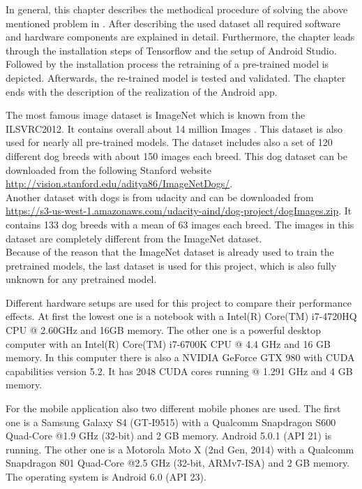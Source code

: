 In general, this chapter describes the methodical procedure of solving the above mentioned problem in . After describing the used dataset all required software and hardware components are explained in detail. Furthermore, the chapter leads through the installation steps of Tensorflow and the setup of Android Studio. Followed by the installation process the retraining of a pre-trained model is depicted. Afterwards, the re-trained model is tested and validated. The chapter ends with the description of the realization of the Android app.

The most famous image dataset is ImageNet which is known from the ILSVRC2012. It contains overall about 14 million Images \citep{ImageNet2010}. This dataset is also used for nearly all pre-trained models. The dataset includes also a set of 120 different dog breeds with about 150 images each breed. This dog dataset can be downloaded from the following Stanford website \url{http://vision.stanford.edu/aditya86/ImageNetDogs/}. \\
Another dataset with dogs is from udacity and can be downloaded from \url{https://s3-us-west-1.amazonaws.com/udacity-aind/dog-project/dogImages.zip}. It contains 133 dog breeds with a mean of 63 images each breed. The images in this dataset are completely different from the ImageNet dataset. \\

Because of the reason that the ImageNet dataset is already used to train the pretrained models, the last dataset is used for this project, which is also fully unknown for any pretrained model.

Different hardware setups are used for this project to compare their performance effects.
At first the lowest one is a notebook with a Intel(R) Core(TM) i7-4720HQ CPU @ 2.60GHz and 16GB memory.
The other one is a powerful desktop computer with an Intel(R) Core(TM) i7-6700K CPU @ 4.4 GHz and 16 GB memory.
In this computer there is also a NVIDIA GeForce GTX 980 with CUDA capabilities version 5.2. It has 2048 CUDA cores running @ 1.291 GHz and 4 GB memory.

For the mobile application also two different mobile phones are used. The first one is a Samsung Galaxy S4 (GT-I9515) with a Qualcomm Snapdragon S600 Quad-Core @1.9 GHz (32-bit) and 2 GB memory. Android 5.0.1 (API 21) is running.
The other one is a Motorola Moto X (2nd Gen, 2014) with a Qualcomm Snapdragon 801 Quad-Core @2.5 GHz (32-bit, ARMv7-ISA) and 2 GB memory. The operating system is Android 6.0 (API 23).

